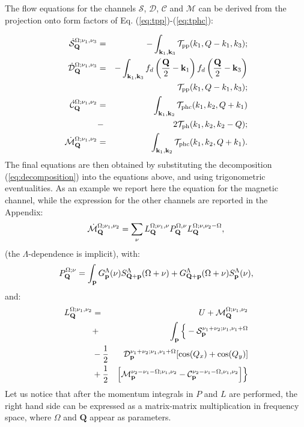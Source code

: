 The flow equations for the channels $\mathcal{S}$,  $\mathcal{D}$, $\mathcal{C}$ and $\mathcal{M}$ can be derived from the projection onto form factors of Eq. (\ref{eq:tpp})-(\ref{eq:tphc}):

\begin{eqnarray}
\dot{\mathcal{S}}_{\mathbf{Q}}^{\Omega;\nu_1,\nu_3}  &=& - \int _{\mathbf{k}_1, \mathbf{k}_3 } \mathcal{T}_{\mathrm{pp}}(k_1,Q-k_1,k_3); \\ 
\dot{\mathcal{D}}_{\mathbf{Q}}^{\Omega;\nu_1,\nu_3}  &=& -
\int _{\mathbf{k}_1,\mathbf{k}_3}  f_d\left( {\frac{\mathbf{Q}}{2} - \mathbf{k}_1} \right ) f_d\left ({\frac{\mathbf{Q}}{2} - \mathbf{k}_3} \right)  \nonumber \\ 
 &&\mathcal{T}_{\mathrm{pp}}(k_1,Q-k_1,k_3) ; 
\\
\nonumber
\dot{\mathcal{C}}_{\mathbf{Q}}^{\Omega;\nu_1,\nu_2} &=& 
\int _{\mathbf{k}_1,\mathbf{k}_2}   \mathcal{T}_{\mathrm{phc}}(k_1,k_2,Q+k_1)\\ &-&2\mathcal{T}_{\mathrm{ph}}(k_1,k_2,k_2-Q) ; 
\\ 
\dot{\mathcal{M}}_{\mathbf{Q}}^{\Omega;\nu_1,\nu_2} & =& 
\int _{\mathbf{k}_1,\mathbf{k}_2}  \mathcal{T}_{\mathrm{phc}}(k_1,k_2,Q+k_1). 
\end{eqnarray}
The final equations are then obtained by substituting the decomposition (\ref{eq:decomposition}) into the equations above, and using trigonometric eventualities.
As an example we report here the equation for the magnetic channel, while the expression for the other channels are reported in the Appendix: 
\begin{equation}
\dot{\mathcal{M}}_{\mathbf{Q}}^{\Omega;\nu_1,\nu_2} = \sum_{\nu} L^{\Omega; \nu_1,\nu}_{\mathbf{Q}} P_{\mathbf{Q}}^{\Omega,\nu} L^{\Omega; \nu,\nu_2-\Omega}_{\mathbf{Q}}, 
\end{equation} 	   
(the $\Lambda$-dependence is implicit), with: 
\begin{equation}
P_{\mathbf{Q}}^{\Omega;\nu} = \int_{\mathbf{p}}  G^\Lambda_{\mathbf{p}}(\nu)S^\Lambda_{\mathbf{Q}+\mathbf{p}}
(\Omega+\nu) +G^\Lambda_{\mathbf{Q}+\mathbf{p}}(\Omega+\nu)
S^\Lambda_{\mathbf{p}} (\nu), 
\end{equation} 
and: 
\begin{eqnarray} 
\nonumber
L^{\Omega;\nu_1,\nu_2}_{\mathbf{Q}}&=&U+\mathcal{M}_{\mathbf{Q}}^{\Omega;\nu_1,\nu_2} \\
\nonumber 
&+& \int_{\mathbf{p}} \Big \{- \mathcal{S}_{\mathbf{p}}^{\nu_1+\nu_2;\nu_1,\nu_1+\Omega}  
 \\
 \nonumber 
&-\frac{1}{2}& \mathcal{D}_{\mathbf{p}}^{\nu_1+\nu_2;\nu_1,\nu_1+\Omega}
[\cos(Q_x)+\cos(Q_y)]
 \\ 
&+\frac{1}{2}& \Big[  \mathcal{M}_{\mathbf{p}}^{\nu_2-\nu_1-\Omega; \nu_1,\nu_2} 
- \mathcal{C}_{\mathbf{p}}^{\nu_2-\nu_1-\Omega,\nu_1,\nu_2} \Big] 
\Big \} 
\end{eqnarray}	 
Let us notice that after the momentum integrals in $P$ and $L$ are performed, the right hand side can be expressed as a matrix-matrix multiplication in frequency space, where $\Omega$ and $\mathbf{Q}$ appear as parameters.

